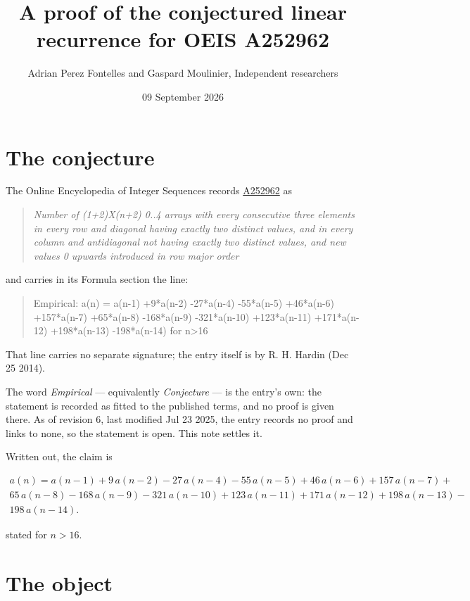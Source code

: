 \documentclass[11pt]{article}
\title{A proof of the conjectured linear recurrence for OEIS A252962}
\author{Adrian Perez Fontelles and Gaspard Moulinier, Independent researchers}
\date{09 September 2026}
\theoremstyle{definition}
\begin{document}
\maketitle
\section{The conjecture}

The Online Encyclopedia of Integer Sequences records \href{https://oeis.org/A252962}{A252962} as

\begin{quote}\itshape Number of (1+2)X(n+2) 0..4 arrays with every consecutive three elements in every row and diagonal having exactly two distinct values, and in every column and antidiagonal not having exactly two distinct values, and new values 0 upwards introduced in row major order\end{quote}

and carries in its Formula section the line:

\begin{quote}\ttfamily Empirical: a(n) = a(n-1) +9*a(n-2) -27*a(n-4) -55*a(n-5) +46*a(n-6) +157*a(n-7) +65*a(n-8) -168*a(n-9) -321*a(n-10) +123*a(n-11) +171*a(n-12) +198*a(n-13) -198*a(n-14) for n>16\end{quote}

That line carries no separate signature; the entry itself is by R. H. Hardin (Dec 25 2014).

The word {\itshape Empirical} --- equivalently {\itshape Conjecture} --- is the entry's own: the statement is recorded as fitted to the published terms, and no proof is given there. As of revision 6, last modified Jul 23 2025, the entry records no proof and links to none, so the statement is open. This note settles it.

Written out, the claim is

\begin{multline*} a(n) = a(n-1) + 9\,a(n-2) - 27\,a(n-4) - 55\,a(n-5) + 46\,a(n-6) + 157\,a(n-7) + \\ 65\,a(n-8) - 168\,a(n-9) - 321\,a(n-10) + 123\,a(n-11) + 171\,a(n-12) + 198\,a(n-13) - \\ 198\,a(n-14). \end{multline*}

stated for $n > 16$.

\section{The object}
\end{document}
